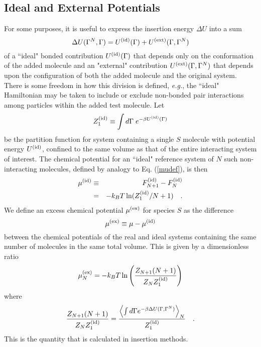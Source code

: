 \documentclass[12pt]{article}
\newcommand{\eg}{{\it e.g.}}
\newcommand\system{\Gamma^{N}}
\newcommand\chain{\Gamma}
\newcommand\delU{\Delta U}
\newcommand\Uid{U^{({\rm id})}}
\newcommand\Uext{U^{({\rm ext})}}
\newcommand\Ztot{Z_{N+1}}
\newcommand\Zsystem{Z_{N}}
\newcommand\Zid{Z^{({\rm id})}}
\newcommand\Fid{F^{({\rm id})}}
\newcommand\muid{\mu^{({\rm id})}}
\newcommand\muex{\mu^{({\rm ex})}}
\begin{document}
\subsection{Ideal and External Potentials}
For some purposes, it is useful to express the insertion energy $\delU$ 
into a sum
\begin{equation}
   \delU(\system, \chain) = \Uid(\chain) + \Uext (\chain, \system)
\end{equation}
of a ``ideal" bonded contribution $\Uid(\chain)$ that depends only on the conformation of the added molecule and an "external" contribution $\Uext(\chain,\system)$ that depends upon the configuration of both the added molecule and the original system.  There is some freedom in how this division is defined, \eg, the ``ideal" Hamiltonian may be taken to include or exclude non-bonded pair interactions among particles within the added test molecule. Let 
\begin{equation}
    \Zid_{1} \equiv \int d\chain \; e^{-\beta \Uid(\chain) }
\end{equation}
be the partition function for system containing a single $S$ molecule with potential energy $\Uid$, confined to the same volume as that of the entire interacting system of interest. The chemical potential for an ``ideal" reference system of $N$ such non-interacting molecules, defined by analogy to Eq. (\ref{mudef}), is then
\begin{eqnarray}
    \muid & \equiv & \Fid_{N+1} - \Fid_{N}  \nonumber \\
          & =      & -k_{B}T\ln(\Zid_{1}/N+1)
    \quad.
\end{eqnarray}
We define an excess chemical potential $\muex$ for species $S$ as the difference
\begin{equation}
     \muex \equiv \mu - \muid
\end{equation}
between the chemical potentials of the real and ideal systems containing the same number of molecules in the same total volume. This is given by a dimensionless ratio
\begin{equation}
   \muex_{N}  = -k_{B}T \ln \left ( \frac{\Ztot (N+1) }{\Zsystem \Zid_{1}} \right )
\end{equation}
where
\begin{equation}
  \frac{\Ztot (N+1)}{\Zsystem \Zid_{1}} = 
  \frac{\left \langle \int d\chain e^{-\beta \delU(\chain, \system)} \right \rangle_{N}} 
       {\Zid_{1}} 
  \quad.
\end{equation}
This is the quantity that is calculated in insertion methods.
\end{document}
